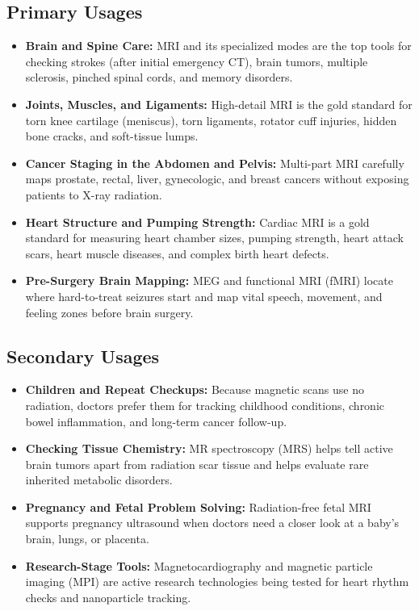 \subsection{Primary Usages}
\begin{itemize}
  \item \textbf{Brain and Spine Care:} MRI and its specialized modes are the top tools for checking strokes (after initial emergency CT), brain tumors, multiple sclerosis, pinched spinal cords, and memory disorders.
  \item \textbf{Joints, Muscles, and Ligaments:} High-detail MRI is the gold standard for torn knee cartilage (meniscus), torn ligaments, rotator cuff injuries, hidden bone cracks, and soft-tissue lumps.
  \item \textbf{Cancer Staging in the Abdomen and Pelvis:} Multi-part MRI carefully maps prostate, rectal, liver, gynecologic, and breast cancers without exposing patients to X-ray radiation.
  \item \textbf{Heart Structure and Pumping Strength:} Cardiac MRI is a gold standard for measuring heart chamber sizes, pumping strength, heart attack scars, heart muscle diseases, and complex birth heart defects.
  \item \textbf{Pre-Surgery Brain Mapping:} MEG and functional MRI (fMRI) locate where hard-to-treat seizures start and map vital speech, movement, and feeling zones before brain surgery.
\end{itemize}

\subsection{Secondary Usages}
\begin{itemize}
  \item \textbf{Children and Repeat Checkups:} Because magnetic scans use no radiation, doctors prefer them for tracking childhood conditions, chronic bowel inflammation, and long-term cancer follow-up.
  \item \textbf{Checking Tissue Chemistry:} MR spectroscopy (MRS) helps tell active brain tumors apart from radiation scar tissue and helps evaluate rare inherited metabolic disorders.
  \item \textbf{Pregnancy and Fetal Problem Solving:} Radiation-free fetal MRI supports pregnancy ultrasound when doctors need a closer look at a baby's brain, lungs, or placenta.
  \item \textbf{Research-Stage Tools:} Magnetocardiography and magnetic particle imaging (MPI) are active research technologies being tested for heart rhythm checks and nanoparticle tracking.
\end{itemize}

